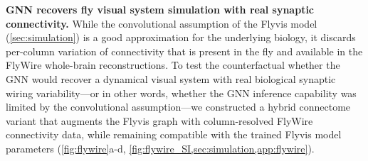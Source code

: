 \documentclass{article}
\begin{document}






% 
% 



\textbf{GNN recovers fly visual system simulation with real synaptic connectivity.}  While the convolutional assumption of the Flyvis model (\cref{sec:simulation}) is a good approximation for the underlying biology, it discards per-column variation of connectivity that is present in the fly and available in the FlyWire whole-brain reconstructions. To test the counterfactual whether the GNN would recover a dynamical visual system with real biological synaptic wiring variability---or in other words, whether the GNN inference capability was limited by the convolutional assumption---we constructed a hybrid connectome variant that augments the Flyvis graph with column-resolved FlyWire connectivity data, while remaining compatible with the trained Flyvis model parameters (\cref{fig:flywire}a-d, \cref{fig:flywire_SI,sec:simulation,app:flywire}). 
\end{document}
